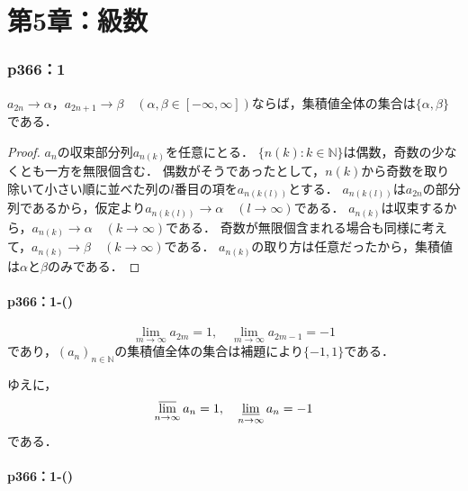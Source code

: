 \documentclass[a4paper,10pt,fleqn]{ltjsarticle}
\begin{document}
\newpage

\part*{第5章：級数}


\section*{p366：1}


$a_{2n} \to \alpha$，$a_{2n+1} \to \beta$$\quad (\alpha,\beta \in [-\infty,\infty])$ならば，集積値全体の集合は$\{\alpha,\beta\}$である．

    \begin{proof}
        $a_n$の収束部分列$a_{n(k)}$を任意にとる．
        $\{n(k):k \in \mathbb{N}\}$は偶数，奇数の少なくとも一方を無限個含む．
        偶数がそうであったとして，$n(k)$から奇数を取り除いて小さい順に並べた列の$l$番目の項を$a_{n(k(l))}$とする．
        $a_{n(k(l))}$は$a_{2n}$の部分列であるから，仮定より$a_{n(k(l))} \to \alpha \quad (l \to \infty)$である．
        $a_{n(k)}$は収束するから，$a_{n(k)} \to \alpha \quad (k \to \infty)$である．
        奇数が無限個含まれる場合も同様に考えて，$a_{n(k)} \to \beta \quad (k \to \infty)$である．
        $a_{n(k)}$の取り方は任意だったから，集積値は$\alpha$と$\beta$のみである．
    \end{proof}

    \subsection*{p366：1-()}

    \begin{tleftbar}
        \[
            \lim_{m \to \infty} a_{2m} = 1 , \quad \lim_{m \to \infty} a_{2m-1} = -1
        \]
        であり，$(a_n)_{n \in \mathbb{N}}$の集積値全体の集合は補題により$\{ -1 , 1 \}$である．

        ゆえに，
        \[
            \varlimsup_{n \to \infty} a_n = 1 , \quad \varliminf_{n \to \infty} a_n =-1
        \]
        である．
    \end{tleftbar}


    \subsection*{p366：1-()}
\end{document}
